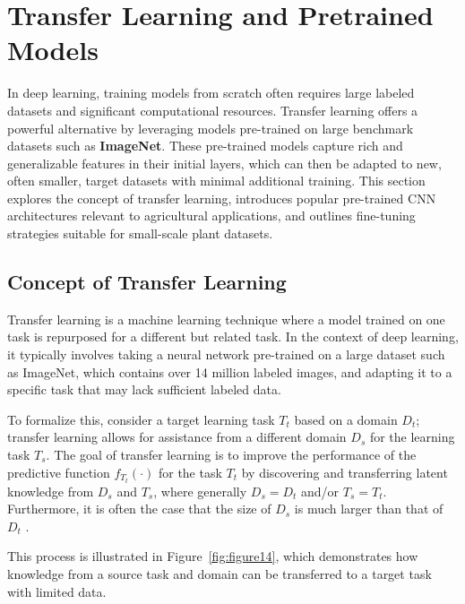 \section{Transfer Learning and Pretrained Models}
In deep learning, training models from scratch often requires large labeled datasets and significant computational resources. Transfer learning offers a powerful alternative by leveraging models pre-trained on large benchmark datasets such as \textbf{ImageNet}. These pre-trained models capture rich and generalizable features in their initial layers, which can then be adapted to new, often smaller, target datasets with minimal additional training.
This section explores the concept of transfer learning, introduces popular pre-trained CNN architectures relevant to agricultural applications, and outlines fine-tuning strategies suitable for small-scale plant datasets.

\subsection{Concept of Transfer Learning}
Transfer learning is a machine learning technique where a model trained on one task is repurposed for a different but related task. In the context of deep learning, it typically involves taking a neural network pre-trained on a large dataset such as ImageNet, which contains over 14 million labeled images, and adapting it to a specific task that may lack sufficient labeled data.

To formalize this, consider a target learning task \( T_t \) based on a domain \( D_t \); transfer learning allows for assistance from a different domain \( D_s \) for the learning task \( T_s \). The goal of transfer learning is to improve the performance of the predictive function \( f_{T_t}(\cdot) \) for the task \( T_t \) by discovering and transferring latent knowledge from \( D_s \) and \( T_s \), where generally \( D_s = D_t \) and/or \( T_s = T_t \). Furthermore, it is often the case that the size of \( D_s \) is much larger than that of \( D_t \) \parencite{tan2018survey}.

This process is illustrated in Figure~\ref{fig:figure14}, which demonstrates how knowledge from a source task and domain can be transferred to a target task with limited data.

